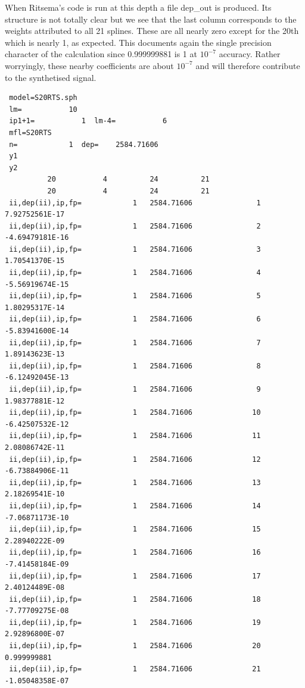 When Ritsema's code is run at this depth a file {\filenamefont dep\_out} is produced.
Its structure is not totally clear but we see that the last column corresponds to 
the weights attributed to all 21 splines. These are all nearly zero except for the 
20th which is nearly 1, as expected. This documents again the single precision character 
of the calculation since 0.999999881 is 1 at $10^{-7}$ accuracy. Rather worryingly, 
these nearby coefficients are about $10^{-7}$ and will therefore contribute to the 
synthetised  signal.  
\begin{verbatim}
 model=S20RTS.sph                                                                      
 lm=           10
 ip1+1=           1  lm-4=           6
 mfl=S20RTS
 n=            1  dep=    2584.71606    
 y1
 y2
          20           4          24          21
          20           4          24          21
 ii,dep(ii),ip,fp=            1   2584.71606               1   7.92752561E-17
 ii,dep(ii),ip,fp=            1   2584.71606               2  -4.69479181E-16
 ii,dep(ii),ip,fp=            1   2584.71606               3   1.70541370E-15
 ii,dep(ii),ip,fp=            1   2584.71606               4  -5.56919674E-15
 ii,dep(ii),ip,fp=            1   2584.71606               5   1.80295317E-14
 ii,dep(ii),ip,fp=            1   2584.71606               6  -5.83941600E-14
 ii,dep(ii),ip,fp=            1   2584.71606               7   1.89143623E-13
 ii,dep(ii),ip,fp=            1   2584.71606               8  -6.12492045E-13
 ii,dep(ii),ip,fp=            1   2584.71606               9   1.98377881E-12
 ii,dep(ii),ip,fp=            1   2584.71606              10  -6.42507532E-12
 ii,dep(ii),ip,fp=            1   2584.71606              11   2.08086742E-11
 ii,dep(ii),ip,fp=            1   2584.71606              12  -6.73884906E-11
 ii,dep(ii),ip,fp=            1   2584.71606              13   2.18269541E-10
 ii,dep(ii),ip,fp=            1   2584.71606              14  -7.06871173E-10
 ii,dep(ii),ip,fp=            1   2584.71606              15   2.28940222E-09
 ii,dep(ii),ip,fp=            1   2584.71606              16  -7.41458184E-09
 ii,dep(ii),ip,fp=            1   2584.71606              17   2.40124489E-08
 ii,dep(ii),ip,fp=            1   2584.71606              18  -7.77709275E-08
 ii,dep(ii),ip,fp=            1   2584.71606              19   2.92896800E-07
 ii,dep(ii),ip,fp=            1   2584.71606              20  0.999999881    
 ii,dep(ii),ip,fp=            1   2584.71606              21  -1.05048358E-07
\end{verbatim}

